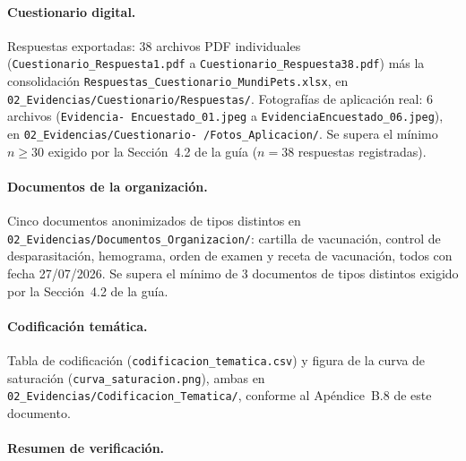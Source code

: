 \documentclass[journal,onecolumn]{IEEEtran}
\begin{document}
	\paragraph{Cuestionario digital.}
	Respuestas exportadas: 38 archivos PDF individuales
	(\texttt{Cuestionario\_Respuesta1.pdf} a
	\texttt{Cuestionario\_Respuesta38.pdf}) más la consolidación
	\texttt{Respuestas\_Cuestionario\_MundiPets.xlsx}, en
	\texttt{02\_Evidencias/Cuestionario/Respuestas/}. Fotografías de aplicación
	real: 6 archivos (\texttt{Evidencia- Encuestado\_01.jpeg} a
	\texttt{EvidenciaEncuestado\_06.jpeg}), en
	\texttt{02\_Evidencias/Cuestionario- /Fotos\_Aplicacion/}. Se supera el
	mínimo $n \geq 30$ exigido por la Sección~4.2 de la guía ($n = 38$
	respuestas registradas).
	
	\paragraph{Documentos de la organización.}
	Cinco documentos anonimizados de tipos distintos en
	\texttt{02\_Evidencias/Documentos\_Organizacion/}: cartilla de vacunación,
	control de desparasitación, hemograma, orden de examen y receta de
	vacunación, todos con fecha 27/07/2026. Se supera el mínimo de 3
	documentos de tipos distintos exigido por la Sección~4.2 de la guía.
	
	\paragraph{Codificación temática.}
	Tabla de codificación (\texttt{codificacion\_tematica.csv}) y figura de la
	curva de saturación (\texttt{curva\_saturacion.png}), ambas en
	\texttt{02\_Evidencias/Codificacion\_Tematica/}, conforme al
	Apéndice~B.8 de este documento.
	
	\paragraph{Resumen de verificación.}
	
\end{document}
